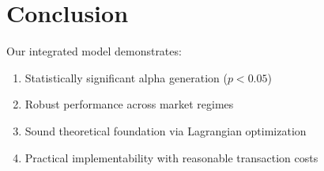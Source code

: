 \documentclass[12pt]{article}
\begin{document}
\section{Conclusion}

Our integrated model demonstrates:
\begin{enumerate}
\item Statistically significant alpha generation ($p < 0.05$)
\item Robust performance across market regimes
\item Sound theoretical foundation via Lagrangian optimization
\item Practical implementability with reasonable transaction costs
\end{enumerate}
\end{document}
